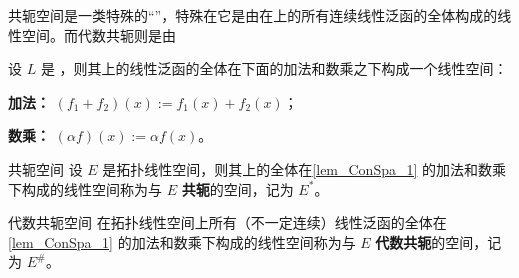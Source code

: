 
共轭空间是一类特殊的“”，特殊在它是由在上的所有连续线性泛函的全体构成的线性空间。而代数共轭则是由

\begin{lemma}{}\label{lem_ConSpa_1}
设 $L$ 是 ，则其上的线性泛函的全体在下面的加法和数乘之下构成一个线性空间：

\textbf{加法：} $(f_1+f_2)(x):=f_1(x)+f_2(x)$；

\textbf{数乘：} $(\alpha f)(x):=\alpha f(x)$。
\end{lemma}

\begin{definition}{共轭空间}
设 $E$ 是拓扑线性空间，则其上的全体在\autoref{lem_ConSpa_1} 的加法和数乘下构成的线性空间称为与 $E$ \textbf{共轭}的空间，记为 $E^*$。
\end{definition}

\begin{definition}{代数共轭空间}
在拓扑线性空间上所有（不一定连续）线性泛函的全体在\autoref{lem_ConSpa_1} 的加法和数乘下构成的线性空间称为与 $E$ \textbf{代数共轭}的空间，记为 $E^{\#}$。
\end{definition}




